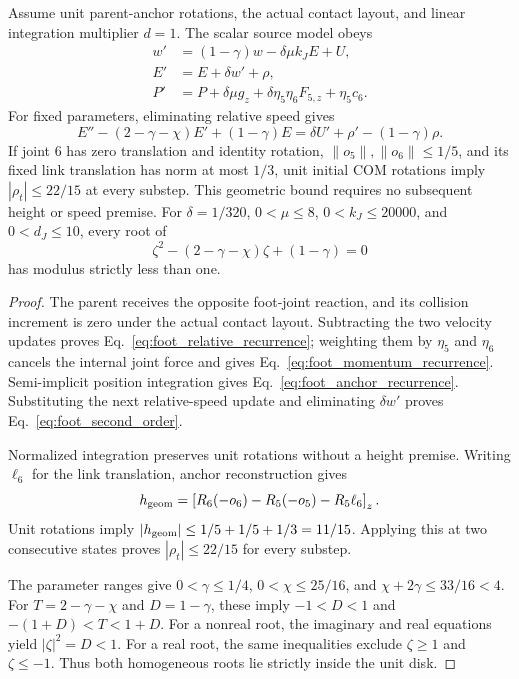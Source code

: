 \begin{proposition}
\label{prop:foot_recurrence}
Assume unit parent-anchor rotations, the actual contact layout, and linear integration multiplier $d=1$.
The scalar source model obeys
\begin{align}
 w'&=(1-\gamma)w-\delta\mu k_J E+U,\label{eq:foot_relative_recurrence}\\
 E'&=E+\delta w'+\rho,\label{eq:foot_anchor_recurrence}\\
 P'&=P+\delta\mu g_z+\delta\eta_5\eta_6F_{5,z}+\eta_5c_6.
 \label{eq:foot_momentum_recurrence}
\end{align}
For fixed parameters, eliminating relative speed gives
\begin{equation}
 E''-(2-\gamma-\chi)E'+(1-\gamma)E
   =\delta U'+\rho'-(1-\gamma)\rho.
 \label{eq:foot_second_order}
\end{equation}
If joint $6$ has zero translation and identity rotation, $\|o_5\|,\|o_6\|\le1/5$, and its fixed link translation has norm at most $1/3$, unit initial COM rotations imply $|\rho_t|\le22/15$ at every substep.
This geometric bound requires no subsequent height or speed premise.
For $\delta=1/320$, $0<\mu\le8$, $0<k_J\le20000$, and $0<d_J\le10$, every root of
\begin{equation}
 \zeta^2-(2-\gamma-\chi)\zeta+(1-\gamma)=0
 \label{eq:foot_homogeneous_roots}
\end{equation}
has modulus strictly less than one.
\end{proposition}

\begin{proof}
The parent receives the opposite foot-joint reaction, and its collision increment is zero under the actual contact layout.
Subtracting the two velocity updates proves Eq.~\eqref{eq:foot_relative_recurrence}; weighting them by $\eta_5$ and $\eta_6$ cancels the internal joint force and gives Eq.~\eqref{eq:foot_momentum_recurrence}.
Semi-implicit position integration gives Eq.~\eqref{eq:foot_anchor_recurrence}.
Substituting the next relative-speed update and eliminating $\delta w'$ proves Eq.~\eqref{eq:foot_second_order}.

Normalized integration preserves unit rotations without a height premise.
Writing $\ell_6$ for the link translation, anchor reconstruction gives
\begin{equation}
 h_{\rm geom}=\left[R_6(-o_6)-R_5(-o_5)-R_5\ell_6\right]_z.
\end{equation}
Unit rotations imply $|h_{\rm geom}|\le1/5+1/5+1/3=11/15$.
Applying this at two consecutive states proves $|\rho_t|\le22/15$ for every substep.

The parameter ranges give $0<\gamma\le1/4$, $0<\chi\le25/16$, and $\chi+2\gamma\le33/16<4$.
For $T=2-\gamma-\chi$ and $D=1-\gamma$, these imply $-1<D<1$ and $-(1+D)<T<1+D$.
For a nonreal root, the imaginary and real equations yield $|\zeta|^2=D<1$.
For a real root, the same inequalities exclude $\zeta\ge1$ and $\zeta\le-1$.
Thus both homogeneous roots lie strictly inside the unit disk.
\end{proof}

